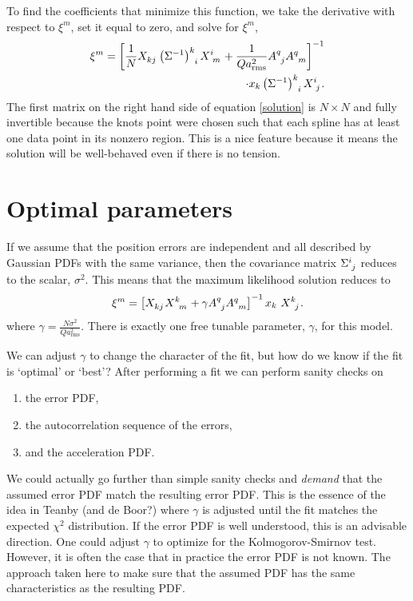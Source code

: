 \documentclass[twocol]{ametsoc}
\begin{document}
To find the coefficients that minimize this function, we take the derivative with respect to $\xi^m$, set it equal to zero, and solve for $\xi^m$,
\begin{equation}
\begin{split}
\xi^m = \left[\frac{1}{N} X\indices{_k_j} \left(\Sigma^{-1}\right)\indices{^k_i}  X\indices{^i_m} + \frac{1}{Q a_{\textrm{rms}}^2} {A}\indices{^q_j}{A}\indices{^q_m} \right]^{-1} \\
\cdot x_k \left(\Sigma^{-1}\right)\indices{^k_i}   X\indices{^i_j}.
\end{split}
\label{solution}
\end{equation}
The first matrix on the right hand side of equation \ref{solution} is $N\times N$ and fully invertible because the knots point were chosen such that each spline has at least one data point in its nonzero region. This is a nice feature because it means the solution will be well-behaved even if there is no tension.


\section{Optimal parameters}

If we assume that the position errors are independent and all described by Gaussian PDFs with the same variance, then the covariance matrix $\Sigma\indices{^i_j}$ reduces to the scalar, $\sigma^2$. This means that the maximum likelihood solution reduces to
\begin{equation}
\xi^m = \left[ X\indices{_k_j}   X\indices{^k_m} + \gamma {A}\indices{^q_j}{A}\indices{^q_m} \right]^{-1} 
 x_k \   X\indices{^k_j}.
\label{scalar-solution}
\end{equation}
where $\gamma = \frac{N \sigma^2}{Q a_{\textrm{rms}}^2}$. There is exactly one free tunable parameter, $\gamma$, for this model.

We can adjust $\gamma$ to change the character of the fit, but how do we know if the fit is `optimal' or `best'? After performing a fit we can perform sanity checks on
\begin{enumerate}
\item the error PDF,
\item the autocorrelation sequence of the errors,
\item and the acceleration PDF.
\end{enumerate}
We could actually go further than simple sanity checks and \emph{demand} that the assumed error PDF match the resulting error PDF. This is the essence of the idea in Teanby (and de Boor?) where $\gamma$ is adjusted until the fit matches the expected $\chi^2$ distribution. If the error PDF is well understood, this is an advisable direction. One could adjust $\gamma$ to optimize for the Kolmogorov-Smirnov test. However, it is often the case that in practice the error PDF is not known. The approach taken here to make sure that the assumed PDF has the same characteristics as the resulting PDF.
\end{document}
